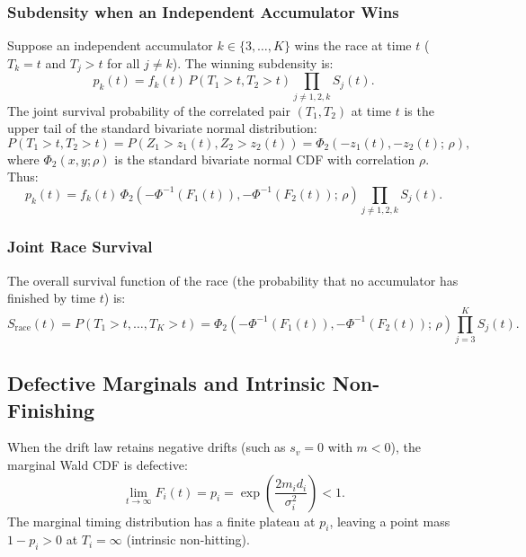 \documentclass[12pt]{article}
\newcommand{\PhiN}{\Phi}
\newcommand{\PhiTwo}{\Phi_2}
\begin{document}
\subsubsection{Subdensity when an Independent Accumulator Wins}
Suppose an independent accumulator $k \in \{3, \dots, K\}$ wins the race at time $t$ ($T_k = t$ and $T_j > t$ for all $j \ne k$). The winning subdensity is:
\begin{equation}
  p_k(t) = f_k(t) \, P(T_1 > t, T_2 > t) \prod_{j \ne 1, 2, k} S_j(t).
\end{equation}
The joint survival probability of the correlated pair $(T_1, T_2)$ at time $t$ is the upper tail of the standard bivariate normal distribution:
\begin{equation}
  P(T_1 > t, T_2 > t) = P(Z_1 > z_1(t), Z_2 > z_2(t)) = \PhiTwo\!\left(-z_1(t), -z_2(t);\, \rho\right),
  \label{eq:copula-pair-survival}
\end{equation}
where $\PhiTwo(x, y; \rho)$ is the standard bivariate normal CDF with correlation $\rho$. Thus:
\begin{equation}
  p_k(t) = f_k(t) \, \PhiTwo\!\left(-\PhiN^{-1}(F_1(t)), -\PhiN^{-1}(F_2(t));\, \rho\right) \prod_{j \ne 1, 2, k} S_j(t).
  \label{eq:copula-indep-winner-density}
\end{equation}

\subsubsection{Joint Race Survival}
The overall survival function of the race (the probability that no accumulator has finished by time $t$) is:
\begin{equation}
  S_{\mathrm{race}}(t) = P(T_1 > t, \dots, T_K > t) = \PhiTwo\!\left(-\PhiN^{-1}(F_1(t)), -\PhiN^{-1}(F_2(t));\, \rho\right) \prod_{j=3}^K S_j(t).
  \label{eq:copula-race-survival}
\end{equation}

\subsection{Defective Marginals and Intrinsic Non-Finishing}
When the drift law retains negative drifts (such as $s_v = 0$ with $m < 0$), the marginal Wald CDF is defective:
\begin{equation}
  \lim_{t \to \infty} F_i(t) = p_i = \exp\!\left(\frac{2 m_i d_i}{\sigma_i^2}\right) < 1.
\end{equation}
The marginal timing distribution has a finite plateau at $p_i$, leaving a point mass $1 - p_i > 0$ at $T_i = \infty$ (intrinsic non-hitting).
\end{document}
